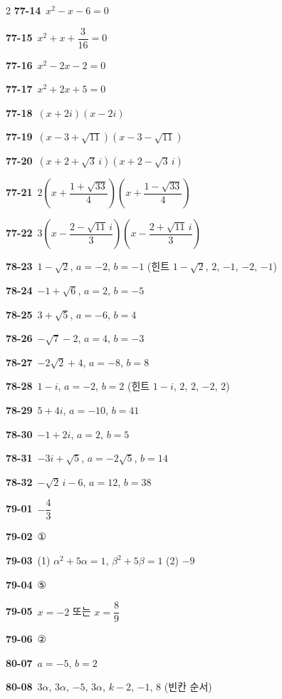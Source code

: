 \documentclass[10pt,a4paper]{article}
\begin{document}
\begin{multicols}{2}
\noindent\textbf{77-14}\ $x^2-x-6=0$\par
\noindent\textbf{77-15}\ $x^2+x+\dfrac{3}{16}=0$\par
\noindent\textbf{77-16}\ $x^2-2x-2=0$\par
\noindent\textbf{77-17}\ $x^2+2x+5=0$\par
\noindent\textbf{77-18}\ $(x+2i)(x-2i)$\par
\noindent\textbf{77-19}\ $(x-3+\sqrt{11})(x-3-\sqrt{11})$\par
\noindent\textbf{77-20}\ $(x+2+\sqrt{3}\,i)(x+2-\sqrt{3}\,i)$\par
\noindent\textbf{77-21}\ $2\left(x+\dfrac{1+\sqrt{33}}{4}\right)\left(x+\dfrac{1-\sqrt{33}}{4}\right)$\par
\noindent\textbf{77-22}\ $3\left(x-\dfrac{2-\sqrt{11}\,i}{3}\right)\left(x-\dfrac{2+\sqrt{11}\,i}{3}\right)$\par
\noindent\textbf{78-23}\ $1-\sqrt{2}$, $a=-2$, $b=-1$ (힌트 $1-\sqrt{2}$, $2$, $-1$, $-2$, $-1$)\par
\noindent\textbf{78-24}\ $-1+\sqrt{6}$, $a=2$, $b=-5$\par
\noindent\textbf{78-25}\ $3+\sqrt{5}$, $a=-6$, $b=4$\par
\noindent\textbf{78-26}\ $-\sqrt{7}-2$, $a=4$, $b=-3$\par
\noindent\textbf{78-27}\ $-2\sqrt{2}+4$, $a=-8$, $b=8$\par
\noindent\textbf{78-28}\ $1-i$, $a=-2$, $b=2$ (힌트 $1-i$, $2$, $2$, $-2$, $2$)\par
\noindent\textbf{78-29}\ $5+4i$, $a=-10$, $b=41$\par
\noindent\textbf{78-30}\ $-1+2i$, $a=2$, $b=5$\par
\noindent\textbf{78-31}\ $-3i+\sqrt{5}$, $a=-2\sqrt{5}$, $b=14$\par
\noindent\textbf{78-32}\ $-\sqrt{2}\,i-6$, $a=12$, $b=38$\par
\noindent\textbf{79-01}\ $-\dfrac{4}{3}$\par
\noindent\textbf{79-02}\ ①\par
\noindent\textbf{79-03}\ (1) $\alpha^2+5\alpha=1$, $\beta^2+5\beta=1$ (2) $-9$\par
\noindent\textbf{79-04}\ ⑤\par
\noindent\textbf{79-05}\ $x=-2$ 또는 $x=\dfrac{8}{9}$\par
\noindent\textbf{79-06}\ ②\par
\noindent\textbf{80-07}\ $a=-5$, $b=2$\par
\noindent\textbf{80-08}\ $3\alpha$, $3\alpha$, $-5$, $3\alpha$, $k-2$, $-1$, $8$ (빈칸 순서)\par

\end{multicols}
\end{document}
